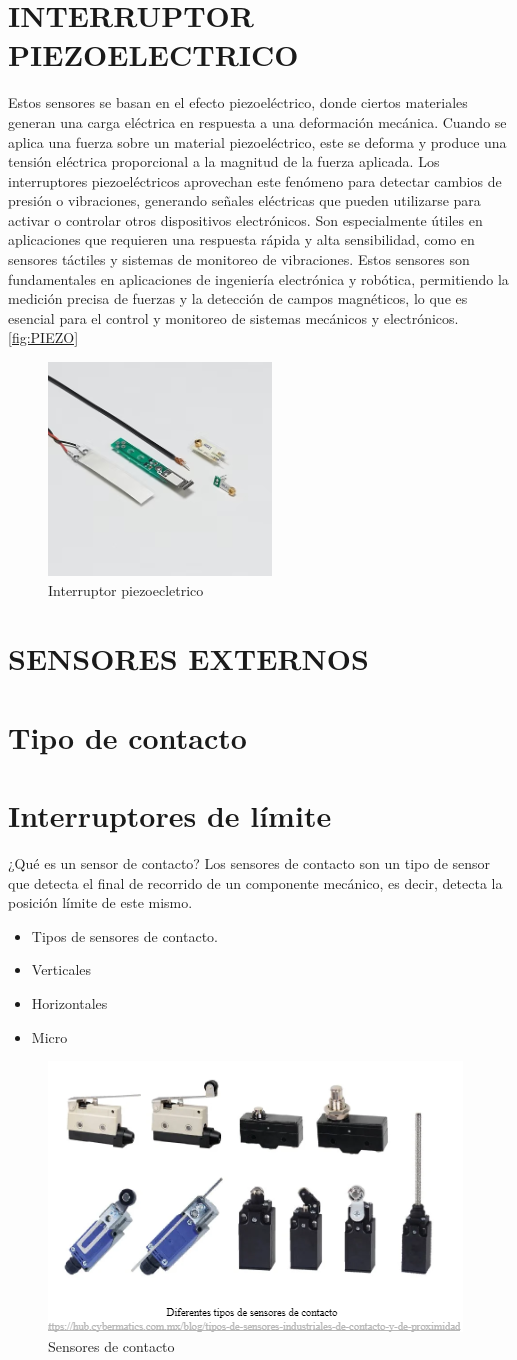 \newpage
\section{INTERRUPTOR PIEZOELECTRICO }
Estos sensores\cite{TE_PiezoFilm} se basan en el efecto piezoeléctrico, donde ciertos materiales generan una carga eléctrica en respuesta a una deformación mecánica. Cuando se aplica una fuerza sobre un material piezoeléctrico, este se deforma y produce una tensión eléctrica proporcional a la magnitud de la fuerza aplicada. Los interruptores piezoeléctricos aprovechan este fenómeno para detectar cambios de presión o vibraciones, generando señales eléctricas que pueden utilizarse para activar o controlar otros dispositivos electrónicos. Son especialmente útiles en aplicaciones que requieren una respuesta rápida y alta sensibilidad, como en sensores táctiles y sistemas de monitoreo de vibraciones.
Estos sensores son fundamentales en aplicaciones de ingeniería electrónica y robótica, permitiendo la medición precisa de fuerzas y la detección de campos magnéticos, lo que es esencial para el control y monitoreo de sistemas mecánicos y electrónicos.\autoref{fig:PIEZO}
\begin{figure}[h]
	\centering
	\includegraphics[width=0.3\linewidth]{img/PIEZO}
	\caption{Interruptor piezoecletrico  }
	\label{fig:PIEZO}
\end{figure}

\section{SENSORES EXTERNOS}
\section*{Tipo de contacto}
\section*{Interruptores de límite }
¿Qué es un sensor de contacto?
Los sensores de contacto\cite{Keyence_Contacto} son un tipo de sensor que detecta el final de recorrido de un componente mecánico, es decir, detecta la posición límite de este mismo.\cite{Cybermatics_Sensores} 
\begin{itemize}
	\item  Tipos de sensores de contacto.
	\item  Verticales 
	\item Horizontales 
	\item Micro
\end{itemize}

\begin{figure}[h]
	\centering
	\includegraphics[width=0.3\linewidth]{img/CONTACTO}
	\caption{Sensores de contacto  }
	\label{fig:CONTACTO}
\end{figure}


